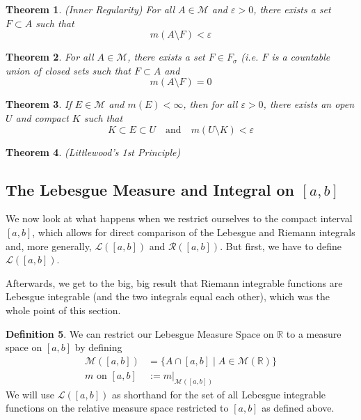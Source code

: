 \documentclass[12pt]{article}
\theoremstyle{plain}
\newtheorem{thm}{Theorem}[subsection]
\theoremstyle{definition}
\newtheorem{defn}[thm]{Definition}
\theoremstyle{remark}
\begin{document}
\begin{thm}
\emph{(Inner Regularity)}
For all $A\in\mathscr{M}$ and $\varepsilon>0$, there exists a set $F \subset A$ such that
\[
    m(A \setminus F) <\varepsilon
\]
\end{thm}

\begin{thm}
For all $A\in\mathscr{M}$, there exists a set $F\in F_\sigma$ (i.e. $F$ is a countable union of closed sets such that $F\subset A$ and 
\[
    m(A\setminus F) = 0
\]
\end{thm}

\begin{thm}
If $E\in\mathscr{M}$ and $m(E)<\infty$, then for all $\varepsilon>0$, there exists an open $U$ and compact $K$ such that 
\[
    K\subset E\subset U 
    \quad\text{and}\quad
    m(U\setminus K)<\varepsilon
\]
\end{thm}

\begin{thm} 
\label{littlewood}    
\emph{(Littlewood's 1st Principle)}
\end{thm}

\newpage
\subsection{The Lebesgue Measure and Integral on $[a,b]$}

We now look at what happens when we restrict ourselves to the compact interval $[a,b]$, which allows for direct comparison of the Lebesgue and Riemann integrals and, more generally, $\mathscr{L}([a,b])$ and $\mathscr{R}([a,b])$. But first, we have to define $\mathscr{L}([a,b])$.

Afterwards, we get to the big, big result that Riemann integrable functions are Lebesgue integrable (and the two integrals equal each other), which was the whole point of this section.

\begin{defn}
We can restrict our Lebesgue Measure Space on $\mathbb{R}$ to a measure space on $[a,b]$ by defining
\begin{align*}
    \mathscr{M}([a,b]) &= \{A\cap[a,b] \; | \;
        A\in\mathscr{M}(\mathbb{R})\} \\
    m \text{ on $[a,b]$} &:= 
        m|_{\mathscr{M}([a,b])}
\end{align*}
We will use $\mathscr{L}([a,b])$ as shorthand for the set of all Lebesgue integrable functions on the relative measure space restricted to $[a,b]$ as defined above.
\end{defn}
\end{document}
